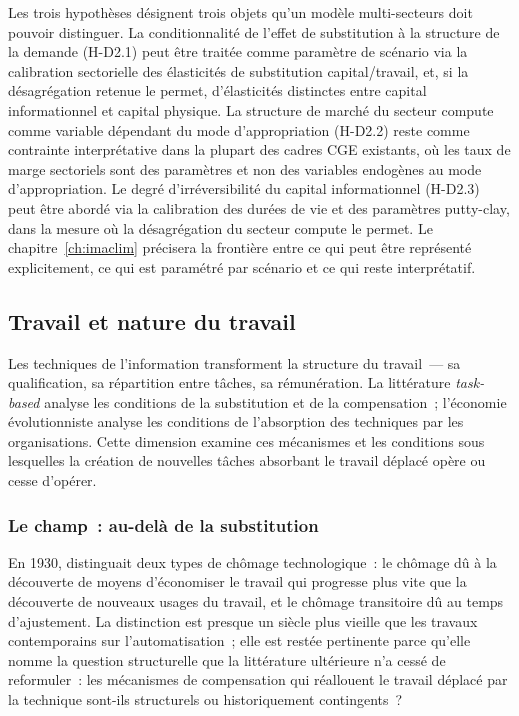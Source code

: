 Les trois hypothèses désignent trois objets qu'un modèle multi-secteurs doit pouvoir distinguer. La conditionnalité de l'effet de substitution à la structure de la demande (H-D2.1) peut être traitée comme paramètre de scénario via la calibration sectorielle des élasticités de substitution capital/travail, et, si la désagrégation retenue le permet, d'élasticités distinctes entre capital informationnel et capital physique. La structure de marché du secteur compute comme variable dépendant du mode d'appropriation (H-D2.2) reste comme contrainte interprétative dans la plupart des cadres CGE existants, où les taux de marge sectoriels sont des paramètres et non des variables endogènes au mode d'appropriation. Le degré d'irréversibilité du capital informationnel (H-D2.3) peut être abordé via la calibration des durées de vie et des paramètres putty-clay, dans la mesure où la désagrégation du secteur compute le permet. Le chapitre~\ref{ch:imaclim} précisera la frontière entre ce qui peut être représenté explicitement, ce qui est paramétré par scénario et ce qui reste interprétatif.



\clearpage
\subsection{Travail et nature du travail}\label{sec:d3-travail}

Les techniques de l'information transforment la structure du travail~--- sa qualification, sa répartition entre tâches, sa rémunération. La littérature \emph{task-based} analyse les conditions de la substitution et de la compensation~; l'économie évolutionniste analyse les conditions de l'absorption des techniques par les organisations. Cette dimension examine ces mécanismes et les conditions sous lesquelles la création de nouvelles tâches absorbant le travail déplacé opère ou cesse d'opérer.

\subsubsection{Le champ~: au-delà de la substitution}

En 1930, \textcite{keynes_economic_1930} distinguait deux types de chômage technologique~: le chômage dû à la découverte de moyens d'économiser le travail qui progresse plus vite que la découverte de nouveaux usages du travail, et le chômage transitoire dû au temps d'ajustement. La distinction est presque un siècle plus vieille que les travaux contemporains sur l'automatisation~; elle est restée pertinente parce qu'elle nomme la question structurelle que la littérature ultérieure n'a cessé de reformuler~: les mécanismes de compensation qui réallouent le travail déplacé par la technique sont-ils structurels ou historiquement contingents~?

